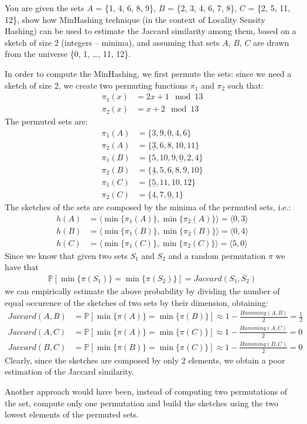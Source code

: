 \exercise

You are given the sets $A$ = \{1, 4, 6, 8, 9\}, $B$ = \{2, 3, 4, 6, 7, 8\}, $C$ =
\{2, 5, 11, 12\}, show how MinHashing technique (in the context of Locality
Sensity Hashing) can be used to estimate the Jaccard similarity among them,
based on a sketch of size 2 (integers -- minima), and assuming that sets $A$,
$B$, $C$ are drawn from the universe \{0, 1, \dots, 11, 12\}.

\solution In order to compute the MinHashing, we first permute the sets: since
we need a sketch of size 2, we create two permuting functions $\pi_1$ and
$\pi_2$ such that:
%
\begin{align*}
  \pi_1(x) &= 2x + 1 \mod 13 \\
  \pi_2(x) &= x + 2 \mod 13
\end{align*}
%
The permuted sets are:
%
\begin{align*}
  \pi_1(A) &= \{ 3, 9, \underline{0}, 4, 6 \} \\
  \pi_2(A) &= \{ \underline{3}, 6, 8, 10, 11 \} \\
  \pi_1(B) &= \{ 5, 10, 9, \underline{0}, 2, 4 \} \\
  \pi_2(B) &= \{ \underline{4}, 5, 6, 8, 9, 10 \} \\
  \pi_1(C) &= \{ \underline{5}, 11, 10, 12 \} \\
  \pi_2(C) &= \{ 4, 7, \underline{0}, 1 \}
\end{align*}
%
The sketches of the sets are composed by the minima of the permuted sets, i.e.:
%
\begin{align*}
  h(A) &= \langle \min \{ \pi_1(A) \}, \min \{ \pi_2(A) \}\rangle =
  \langle 0, 3 \rangle \\
  h(B) &= \langle \min \{ \pi_1(B) \}, \min \{ \pi_2(B) \}\rangle =
  \langle 0, 4 \rangle \\
  h(C) &= \langle \min \{ \pi_1(C) \}, \min \{ \pi_2(C) \}\rangle =
  \langle 5, 0 \rangle
\end{align*}
%
Since we know that given two sets $S_1$ and $S_2$ and a random permutation $\pi$
we have that
%
\begin{align*}
  \mathbb{P}[ \min \{ \pi(S_1) \} = \min \{ \pi(S_2) \} ] = Jaccard(S_1, S_2)
\end{align*}
%
we can empirically estimate the above probability by dividing the number of
equal occurence of the sketches of two sets by their dimension, obtaining:
%
\begin{align*}
  Jaccard(A, B) &= \mathbb{P}[ \min \{ \pi(A) \} = \min \{ \pi(B) \} ]
  \approx 1 - \frac{Hamming(A, B)}{2} = \frac{1}{2} \\
  Jaccard(A, C) &= \mathbb{P}[ \min \{ \pi(A) \} = \min \{ \pi(C) \} ]
  \approx 1 - \frac{Hamming(A, C)}{2} = 0 \\
  Jaccard(B, C) &= \mathbb{P}[ \min \{ \pi(B) \} = \min \{ \pi(C) \} ]
  \approx 1 - \frac{Hamming(B, C)}{2} = 0
\end{align*}
%
Clearly, since the sketches are composed by only 2 elements, we obtain a poor
estimation of the Jaccard similarity.

Another approach would have been, instead of computing two permutations of the
set, compute only one permutation and build the sketches using the two lowest
elements of the permuted sets.
